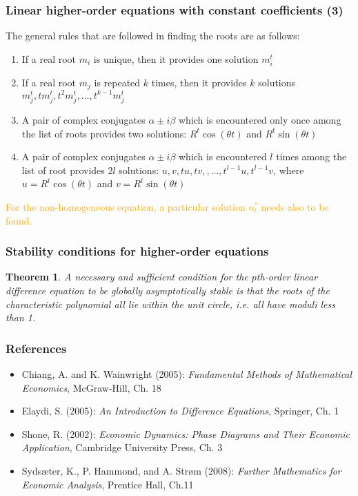 \documentclass[10pt,usenames,dvipsnames]{beamer}
\theoremstyle{plain}
\newtheorem{thm}{Theorem}
\theoremstyle{definition}
\begin{document}
\begin{frame}[fragile]
\frametitle{Linear higher-order equations with constant coefficients (3)}
The general rules that are followed in finding the roots are as follows:
	\begin{enumerate}
		\item If a real root $m_{i}$ is unique, then it provides one solution $m_{i}^{t}$
		\item If a real root $m_{j}$ is repeated $k$ times, then it provides $k$ solutions $m_{j}^{t}, tm_{j}^{t}, t^{2}m_{j}^{t},\ldots,t^{k-1}m_{j}^{t}$
		\item A pair of complex conjugates  $\alpha \pm i\beta$ which is encountered only once among the list of roots provides two solutions: $R^{t}\cos(\theta t)$ and $R^{t}\sin(\theta t)$
		\item A pair of complex conjugates  $\alpha \pm i\beta$ which is encountered $l$ times among the list of root provides $2l$ solutions: $u, v, tu, tv,, \ldots, t^{l-1}u, t^{l-1}v$, where  $u = R^{t}\cos(\theta t)$ and $v = R^{t}\sin(\theta t)$
	\end{enumerate}
	\textcolor{orange}{For the non-homogeneous equation, a particular solution $u_{t}^{*}$ needs also to be found.}
\end{frame}

\begin{frame}[fragile]
\frametitle{Stability conditions for higher-order equations}
\begin{thm}
	A necessary and sufficient condition for the $p$th-order linear difference equation to be globally asymptotically stable is that the roots of the characteristic polynomial all lie within the unit circle, i.e. all have moduli less than 1.
\end{thm}
\end{frame}

\begin{frame}[fragile]
\frametitle{References}
\begin{itemize}
	\item Chiang, A. and K. Wainwright (2005): \emph{Fundamental Methods of Mathematical Economics}, McGraw-Hill, Ch. 18
	\item Elaydi, S. (2005): \emph{An Introduction to Difference Equations}, Springer, Ch. 1
	\item Shone, R. (2002): \emph{Economic Dynamics: Phase Diagrams and Their Economic Application}, Cambridge University Press, Ch. 3
	\item Syds\ae ter, K., P. Hammond, and A. Str\o m (2008): \emph{Further Mathematics for Economic Analysis}, Prentice Hall, Ch.11
\end{itemize}
\end{frame}
\end{document}

